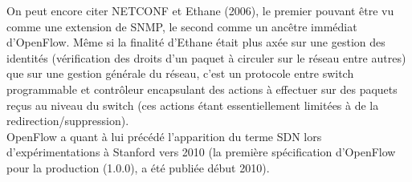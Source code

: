 On peut encore citer NETCONF et Ethane (2006), le premier pouvant être vu comme une extension de SNMP, le second comme un ancêtre immédiat d'OpenFlow. Même si la finalité d'Ethane était plus axée sur une gestion des identités (vérification des droits d'un paquet à circuler sur le réseau entre autres) que sur une gestion générale du réseau, c'est un protocole entre switch programmable et contrôleur encapsulant des actions à effectuer sur des paquets reçus au niveau du switch (ces actions étant essentiellement limitées à de la redirection/suppression).\\

OpenFlow a quant à lui précédé l'apparition du terme SDN lors d'expérimentations à Stanford vers 2010 (la première spécification d'OpenFlow pour la production (1.0.0), a été publiée début 2010).